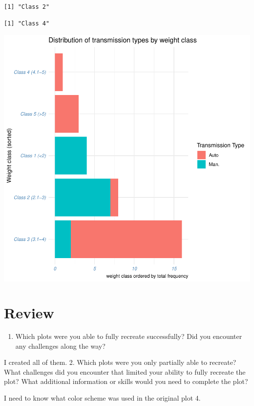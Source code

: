 \documentclass[
  man,
  floatsintext,
  longtable,
  nolmodern,
  notxfonts,
  notimes,
  colorlinks=true,linkcolor=blue,citecolor=blue,urlcolor=blue]{apa7}
\providecommand{\tightlist}{%
  \setlength{\itemsep}{0pt}\setlength{\parskip}{0pt}}
\begin{document}
\begin{verbatim}
[1] "Class 2"
\end{verbatim}

\begin{verbatim}
[1] "Class 4"
\end{verbatim}

\includegraphics{data-visualization_files/figure-pdf/Stacked barplot-1.pdf}

\section{Review}\label{review}

\begin{enumerate}
\def\labelenumi{\arabic{enumi}.}
\tightlist
\item
  Which plots were you able to fully recreate successfully? Did you
  encounter any challenges along the way?
\end{enumerate}

I created all of them. 2. Which plots were you only partially able to
recreate? What challenges did you encounter that limited your ability to
fully recreate the plot? What additional information or skills would you
need to complete the plot?

I need to know what color scheme was used in the original plot 4.
\end{document}
